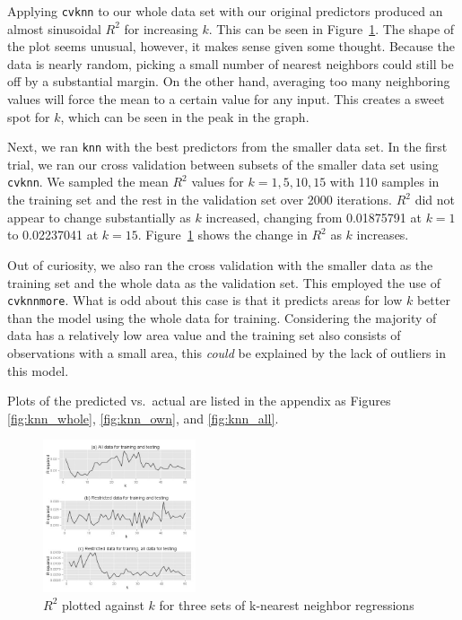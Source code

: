 \documentclass{article}
\begin{document}
Applying \verb=cvknn= to our whole data set with our original predictors
produced an almost sinusoidal $R^2$ for increasing $k$. This can be seen in
Figure~\ref{fig:r2knn}. The shape of the plot seems unusual, however, it
makes sense given some thought. Because the data is nearly random, picking a
small number of nearest neighbors could still be off by a substantial margin.
On the other hand, averaging too many neighboring values will force the mean to
a certain value for any input. This creates a sweet spot for $k$, which can be
seen in the peak in the graph.

Next, we ran \verb=knn= with the best predictors from the smaller data set. In
the first trial, we ran our cross validation between subsets of the smaller
data set using \verb=cvknn=. We sampled the mean $R^2$ values for $k=1,5,10,15$
with 110 samples in the training set and the rest in the validation set over
2000 iterations. $R^2$ did not appear to change substantially as $k$ increased,
changing from 0.01875791 at $k=1$ to 0.02237041 at $k=15$.
Figure~\ref{fig:r2knn} shows the change in $R^2$ as $k$ increases.

Out of curiosity, we also ran the cross validation with the smaller data as the
training set and the whole data as the validation set. This employed the use of
\verb=cvknnmore=. What is odd about this case is that it predicts areas for
low $k$ better than the model using the whole data for training. Considering
the majority of data has a relatively low area value and the training set also
consists of observations with a small area, this \emph{could} be explained by
the lack of outliers in this model.

Plots of the predicted vs.\ actual are listed in the appendix as
Figures \ref{fig:knn_whole}, \ref{fig:knn_own}, and \ref{fig:knn_all}.

\begin{figure}
  \centering
  \includegraphics[width=0.4\textwidth]{r2knn.jpg}
  \caption{$R^2$ plotted against $k$ for three sets of k-nearest neighbor
  regressions}
  \label{fig:r2knn}
\end{figure}
\end{document}

